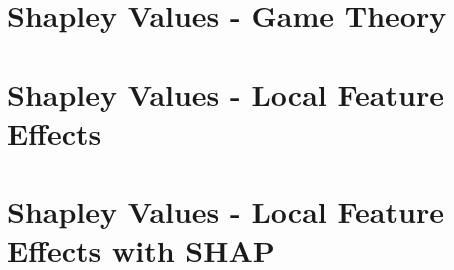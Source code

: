 \documentclass[11pt,compress,t,notes=noshow, aspectratio=169, xcolor=table]{beamer}
\begin{document}



\section{Shapley Values - Game Theory}


\section{Shapley Values - Local Feature Effects}


\section{Shapley Values - Local Feature Effects with SHAP}

\end{document}

